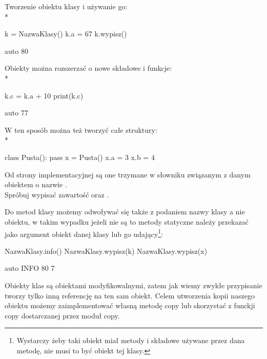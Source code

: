 Tworzenie obiektu klasy i używanie go:
\\*
\begin{CodeFrame}[python]{0.55\textwidth}
k = NazwaKlasy()
k.a = 67
k.wypisz()
\end{CodeFrame}
\begin{CodeFrame}{auto}
80
\end{CodeFrame}

Obiekty można rozszerzać o nowe składowe i funkcje:
\\*
\begin{CodeFrame}[python]{0.55\textwidth}
k.c = k.a + 10
print(k.c)
\end{CodeFrame}
\begin{CodeFrame}{auto}
77
\end{CodeFrame}

W ten sposób można też tworzyć całe struktury:
\\*
\begin{CodeFrame}[python]{0.55\textwidth}
class Pusta():
  pass
x = Pusta()
x.a = 3
x.b = 4
\end{CodeFrame}
\begin{minipage}[t]{0.4\textwidth}
\vspace{6pt}Od strony implementacyjnej są one trzymane w słowniku związanym z danym obiektem o nazwie .\\
Spróbuj wypisać zawartość  oraz .
\end{minipage}

Do metod klasy możemy odwoływać się także z podaniem nazwy klasy a nie obiektu, w takim wypadku jeżeli nie są to metody statyczne należy przekazać jako argument obiekt danej klasy
lub go udający\footnote{
Wystarczy żeby taki obiekt miał metody i składowe używane przez dana metodę, nie musi to być obiekt tej klasy.
}:

\begin{CodeFrame}[python]{0.55\textwidth}
NazwaKlasy.info()
NazwaKlasy.wypisz(k)
NazwaKlasy.wypisz(x)
\end{CodeFrame}
\begin{CodeFrame}{auto}
INFO
80
7
\end{CodeFrame}

Obiekty klas są obiektami modyfikowalnymi, zatem jak wiemy zwykłe przypisanie tworzy tylko inną referencję na ten sam obiekt.
Celem utworzenia kopii naszego obiektu możemy zaimplementować własną metodę copy lub skorzystać z funckji copy dostarczanej przez moduł copy.

